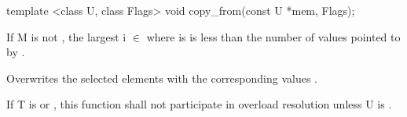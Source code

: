 \begin{itemdecl}
template <class U, class Flags> void copy_from(const U *mem, Flags);
\end{itemdecl}
\begin{itemdescr}
  If \type M is not \bool, the largest i $\in$ \code{[0, M::size())} where  is \true is less than the number of values pointed to by .

  \pnum\effects Overwrites the selected elements with the corresponding values  .

  \pnum\remarks If \type T is \bool or , this function shall not participate in overload resolution unless \type U is \bool.
\end{itemdescr}

